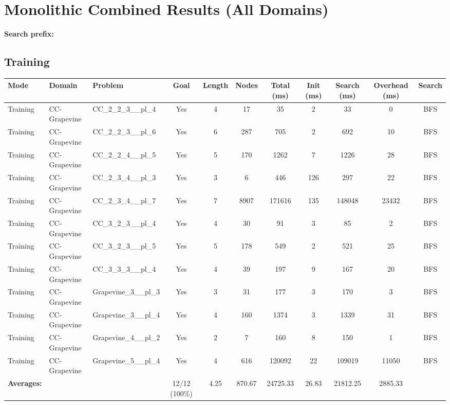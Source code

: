 \documentclass{article}
\begin{document}
\section*{Monolithic Combined Results (All Domains)}
\textbf{Search prefix:} 
\\[0.5cm]
\subsection*{Training}
\begin{tabular}{lllcccccccc}
\toprule
Mode & Domain & Problem & Goal & Length & Nodes & Total (ms) & Init (ms) & Search (ms) & Overhead (ms) & Search \\
\midrule
Training & CC-Grapevine & CC\_2\_2\_3\_\_pl\_4 & Yes & 4 & 17 & 35 & 2 & 33 & 0 & BFS \\
Training & CC-Grapevine & CC\_2\_2\_3\_\_pl\_6 & Yes & 6 & 287 & 705 & 2 & 692 & 10 & BFS \\
Training & CC-Grapevine & CC\_2\_2\_4\_\_pl\_5 & Yes & 5 & 170 & 1262 & 7 & 1226 & 28 & BFS \\
Training & CC-Grapevine & CC\_2\_3\_4\_\_pl\_3 & Yes & 3 & 6 & 446 & 126 & 297 & 22 & BFS \\
Training & CC-Grapevine & CC\_2\_3\_4\_\_pl\_7 & Yes & 7 & 8907 & 171616 & 135 & 148048 & 23432 & BFS \\
Training & CC-Grapevine & CC\_3\_2\_3\_\_pl\_4 & Yes & 4 & 30 & 91 & 3 & 85 & 2 & BFS \\
Training & CC-Grapevine & CC\_3\_2\_3\_\_pl\_5 & Yes & 5 & 178 & 549 & 2 & 521 & 25 & BFS \\
Training & CC-Grapevine & CC\_3\_3\_3\_\_pl\_4 & Yes & 4 & 39 & 197 & 9 & 167 & 20 & BFS \\
Training & CC-Grapevine & Grapevine\_3\_\_pl\_3 & Yes & 3 & 31 & 177 & 3 & 170 & 3 & BFS \\
Training & CC-Grapevine & Grapevine\_3\_\_pl\_4 & Yes & 4 & 160 & 1374 & 3 & 1339 & 31 & BFS \\
Training & CC-Grapevine & Grapevine\_4\_\_pl\_2 & Yes & 2 & 7 & 160 & 8 & 150 & 1 & BFS \\
Training & CC-Grapevine & Grapevine\_5\_\_pl\_4 & Yes & 4 & 616 & 120092 & 22 & 109019 & 11050 & BFS \\
\textbf{Averages:} & & & 12/12 (100\%) & 4.25 & 870.67 & 24725.33 & 26.83 & 21812.25 & 2885.33 & \\
\bottomrule
\end{tabular}
\newpage
\end{document}
